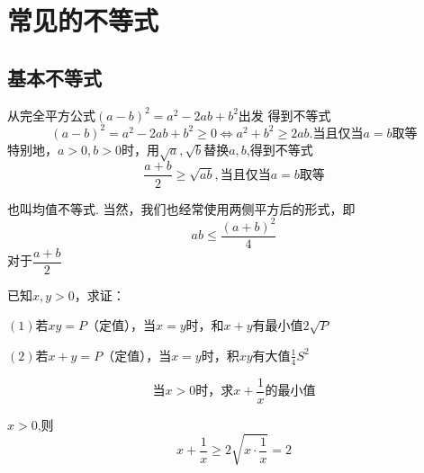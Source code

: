 \section{常见的不等式}
\subsection{基本不等式}
从完全平方公式$(a-b)^2=a^2-2ab+b^2$出发
得到不等式
\[(a-b)^2=a^2-2ab+b^2 \geq 0 \Leftrightarrow a^2+b^2\geq 2ab.\text{当且仅当$a=b$取等} \]
特别地，$a>0,b>0$时，用$\sqrt{a},\sqrt{b}$替换$a,b$,得到不等式
\[\frac{a+b}{2}\geq \sqrt{ab},\text{当且仅当$a=b$取等}\]
\begin{theorem}\label{thm:基本不等式}
    
\end{theorem}
也叫均值不等式.
当然，我们也经常使用两侧平方后的形式，即
\[ab\leq \frac{(a+b)^2}{4}\]
对于$\dfrac{a+b}{2}$
\begin{example}
    已知$x,y>0$，求证：

    $(1)$若$xy=P$（定值），当$x=y$时，和$x+y$有最小值$2\sqrt{P}$

    $(2)$若$x+y=P$（定值），当$x=y$时，积$xy$有大值$\frac{1}{4}S^2$
\end{example}
\begin{example}
   \[ \text{当$x>0$时，求}x+\frac{1}{x}\text{的最小值}\]
\end{example}
\begin{jie}
    $x>0$,则
\[x+\frac{1}{x} \geq 2\sqrt{x\cdot\frac{1}{x}}=2\]
\end{jie}

